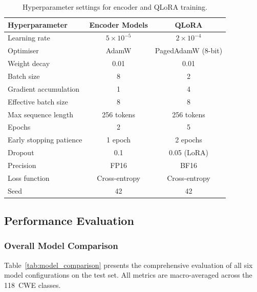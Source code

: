 \begin{table}[t]
\centering
\caption{Hyperparameter settings for encoder and QLoRA training.}
\label{tab:hyperparams}
\begin{tabular}{lcc}
\hline
\textbf{Hyperparameter} & \textbf{Encoder Models} & \textbf{QLoRA} \\
\hline
Learning rate            & $5 \times 10^{-5}$      & $2 \times 10^{-4}$ \\
Optimiser                & AdamW                   & PagedAdamW (8-bit) \\
Weight decay             & 0.01                    & 0.01 \\
Batch size               & 8                       & 2 \\
Gradient accumulation    & 1                       & 4 \\
Effective batch size     & 8                       & 8 \\
Max sequence length      & 256 tokens              & 256 tokens \\
Epochs                   & 2                       & 5 \\
Early stopping patience  & 1 epoch                 & 2 epochs \\
Dropout                  & 0.1                     & 0.05 (LoRA) \\
Precision                & FP16                    & BF16 \\
Loss function            & Cross-entropy           & Cross-entropy \\
Seed                     & 42                      & 42 \\
\hline
\end{tabular}
\end{table}

\subsection{Performance Evaluation}
\label{sec:performance}

\subsubsection{Overall Model Comparison}
Table~\ref{tab:model_comparison} presents the comprehensive evaluation of
all six model configurations on the test set.  All metrics are
macro-averaged across the 118~CWE classes.

